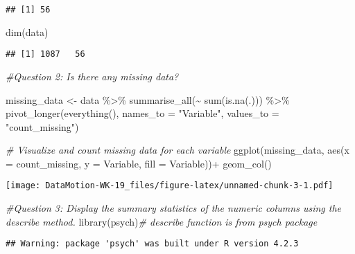 \documentclass[
]{article}
\newenvironment{Shaded}{\begin{snugshade}}{\end{snugshade}}
\newcommand{\AttributeTok}[1]{\textcolor[rgb]{0.77,0.63,0.00}{#1}}
\newcommand{\CommentTok}[1]{\textcolor[rgb]{0.56,0.35,0.01}{\textit{#1}}}
\newcommand{\FunctionTok}[1]{\textcolor[rgb]{0.00,0.00,0.00}{#1}}
\newcommand{\NormalTok}[1]{#1}
\newcommand{\OtherTok}[1]{\textcolor[rgb]{0.56,0.35,0.01}{#1}}
\newcommand{\SpecialCharTok}[1]{\textcolor[rgb]{0.00,0.00,0.00}{#1}}
\newcommand{\StringTok}[1]{\textcolor[rgb]{0.31,0.60,0.02}{#1}}
\begin{document}
\begin{verbatim}
## [1] 56
\end{verbatim}

\begin{Shaded}
\begin{Highlighting}[]
\FunctionTok{dim}\NormalTok{(data)}
\end{Highlighting}
\end{Shaded}

\begin{verbatim}
## [1] 1087   56
\end{verbatim}

\begin{Shaded}
\begin{Highlighting}[]
\CommentTok{\#Question 2: Is there any missing data?}

\NormalTok{missing\_data }\OtherTok{\textless{}{-}}\NormalTok{ data }\SpecialCharTok{\%\textgreater{}\%} 
  \FunctionTok{summarise\_all}\NormalTok{(}\SpecialCharTok{\textasciitilde{}} \FunctionTok{sum}\NormalTok{(}\FunctionTok{is.na}\NormalTok{(.))) }\SpecialCharTok{\%\textgreater{}\%} 
  \FunctionTok{pivot\_longer}\NormalTok{(}\FunctionTok{everything}\NormalTok{(), }\AttributeTok{names\_to =} \StringTok{"Variable"}\NormalTok{, }\AttributeTok{values\_to =} \StringTok{"count\_missing"}\NormalTok{)}

\CommentTok{\# Visualize and count missing data for each variable }
\FunctionTok{ggplot}\NormalTok{(missing\_data, }\FunctionTok{aes}\NormalTok{(}\AttributeTok{x =}\NormalTok{ count\_missing, }\AttributeTok{y =}\NormalTok{ Variable, }\AttributeTok{fill =}\NormalTok{ Variable))}\SpecialCharTok{+}
  \FunctionTok{geom\_col}\NormalTok{()}
\end{Highlighting}
\end{Shaded}

\texttt{[image: DataMotion-WK-19\_files/figure-latex/unnamed-chunk-3-1.pdf]}

\begin{Shaded}
\begin{Highlighting}[]
\CommentTok{\#Question 3: Display the summary statistics of the numeric columns using the describe method.}
\FunctionTok{library}\NormalTok{(psych)}\CommentTok{\# describe function is from psych package}
\end{Highlighting}
\end{Shaded}

\begin{verbatim}
## Warning: package 'psych' was built under R version 4.2.3
\end{verbatim}
\end{document}
